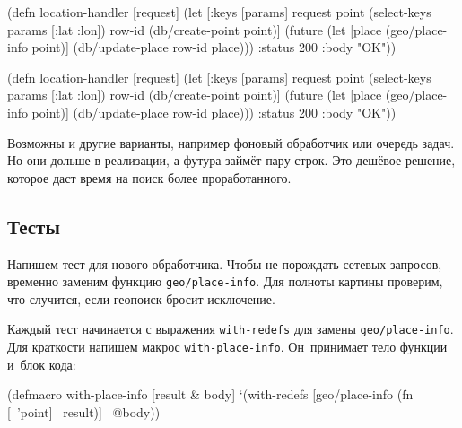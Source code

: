 \begin{english}
  \begin{clojure}
(defn location-handler
  [request]
  (let [{:keys [params]} request
        point (select-keys params
                [:lat :lon])
        row-id (db/create-point point)]
    (future
      (let [place (geo/place-info
                    point)]
        (db/update-place row-id place)))
    {:status 200 :body "OK"}))
  \end{clojure}
\end{english}

\else

\begin{english}
  \begin{clojure}
(defn location-handler
  [request]
  (let [{:keys [params]} request
        point (select-keys params [:lat :lon])
        row-id (db/create-point point)]
    (future
      (let [place (geo/place-info point)]
        (db/update-place row-id place)))
    {:status 200 :body "OK"}))
  \end{clojure}
\end{english}

\fi

Возможны и другие варианты, например фоновый обработчик или очередь задач. Но
они дольше в реализации, а футура займёт пару строк. Это дешёвое решение,
которое даст время на поиск более проработанного.

\subsection{Тесты}


Напишем тест для нового обработчика. Чтобы не порождать сетевых запросов,
временно заменим функцию \verb|geo/place-info|. Для полноты картины проверим,
что случится, если геопоиск бросит исключение.

Каждый тест начинается с выражения \verb|with-redefs| для замены
\verb|geo/place-info|. Для краткости напишем макрос
\verb|with-place-info|. Он~принимает тело функции и~блок кода:

\begin{english}
  \begin{clojure}
(defmacro with-place-info
  [result & body]
  `(with-redefs [geo/place-info
                 (fn [~'point] ~result)]
     ~@body))
  \end{clojure}
\end{english}

